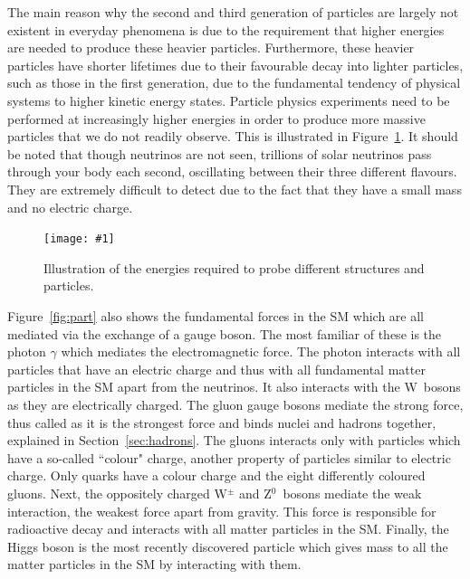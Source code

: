 \documentclass[twocolumn]{article}
\newcommand{\insertFigure}[1]{%
   \texttt{[image: \#1]}%
}
\begin{document}
The main reason why the second and third generation of particles are largely not existent in everyday phenomena is due to the requirement that higher energies are needed to produce these heavier particles. Furthermore, these heavier particles have shorter lifetimes due to their favourable decay into lighter particles, such as those in the first generation, due to the fundamental tendency of physical systems to higher kinetic energy states. Particle physics experiments need to be performed at increasingly higher energies in order to produce more massive particles that we do not readily observe. This is illustrated in Figure~\ref{fig:energy}. It should be noted that though neutrinos are not seen, trillions of solar neutrinos pass through your body each second, oscillating between their three different flavours.~\cite{Thompson} They are extremely difficult to detect due to the fact that they have a small mass and no electric charge. \\
\begin{figure}[!h]
	\centering
	\insertFigure{Images/energy.png}
	\caption{Illustration of the energies required to probe different structures and particles.~\cite{Thompson}}
	\label{fig:energy}
\end{figure}
\par Figure~\ref{fig:part} also shows the fundamental forces in the SM which are all mediated via the exchange of a gauge boson. The most familiar of these is the photon $\gamma$ which mediates the electromagnetic force. The photon interacts with all particles that have an electric charge and thus with all fundamental matter particles in the SM apart from the neutrinos. It also interacts with the W~bosons as they are electrically charged. The gluon gauge bosons mediate the strong force, thus called as it is the strongest force and binds nuclei and hadrons together, explained in Section~\ref{sec:hadrons}. The gluons interacts only with particles which have a so-called ``colour" charge, another property of particles similar to electric charge. Only quarks have a colour charge and the eight differently coloured gluons. Next, the oppositely charged W$^{\pm}$ and Z$^0$~bosons mediate the weak interaction, the weakest force apart from gravity. This force is responsible for radioactive decay and interacts with all matter particles in the SM. Finally, the Higgs boson is the most recently discovered particle which gives mass to all the matter particles in the SM by interacting with them.
\end{document}
